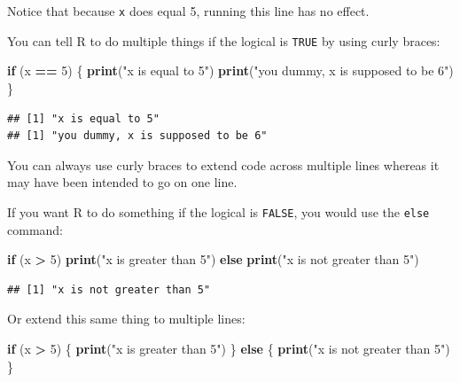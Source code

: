 \documentclass[]{book}
\newenvironment{Shaded}{\begin{snugshade}}{\end{snugshade}}
\newcommand{\KeywordTok}[1]{\textcolor[rgb]{0.13,0.29,0.53}{\textbf{#1}}}
\newcommand{\DecValTok}[1]{\textcolor[rgb]{0.00,0.00,0.81}{#1}}
\newcommand{\StringTok}[1]{\textcolor[rgb]{0.31,0.60,0.02}{#1}}
\newcommand{\ControlFlowTok}[1]{\textcolor[rgb]{0.13,0.29,0.53}{\textbf{#1}}}
\newcommand{\OperatorTok}[1]{\textcolor[rgb]{0.81,0.36,0.00}{\textbf{#1}}}
\newcommand{\NormalTok}[1]{#1}
\theoremstyle{definition}
\theoremstyle{definition}
\theoremstyle{definition}
\theoremstyle{remark}
\begin{document}
Notice that because \texttt{x} does equal 5, running this line has no
effect.

You can tell R to do multiple things if the logical is \texttt{TRUE} by
using curly braces:

\begin{Shaded}
\begin{Highlighting}[]
\ControlFlowTok{if}\NormalTok{ (x }\OperatorTok{==}\StringTok{ }\DecValTok{5}\NormalTok{) \{}
  \KeywordTok{print}\NormalTok{(}\StringTok{"x is equal to 5"}\NormalTok{)}
  \KeywordTok{print}\NormalTok{(}\StringTok{"you dummy, x is supposed to be 6"}\NormalTok{)}
\NormalTok{\}}
\end{Highlighting}
\end{Shaded}

\begin{verbatim}
## [1] "x is equal to 5"
## [1] "you dummy, x is supposed to be 6"
\end{verbatim}

You can always use curly braces to extend code across multiple lines
whereas it may have been intended to go on one line.

If you want R to do something if the logical is \texttt{FALSE}, you
would use the \texttt{else} command:

\begin{Shaded}
\begin{Highlighting}[]
\ControlFlowTok{if}\NormalTok{ (x }\OperatorTok{>}\StringTok{ }\DecValTok{5}\NormalTok{) }\KeywordTok{print}\NormalTok{(}\StringTok{"x is greater than 5"}\NormalTok{) }\ControlFlowTok{else} \KeywordTok{print}\NormalTok{(}\StringTok{"x is not greater than 5"}\NormalTok{)}
\end{Highlighting}
\end{Shaded}

\begin{verbatim}
## [1] "x is not greater than 5"
\end{verbatim}

Or extend this same thing to multiple lines:

\begin{Shaded}
\begin{Highlighting}[]
\ControlFlowTok{if}\NormalTok{ (x }\OperatorTok{>}\StringTok{ }\DecValTok{5}\NormalTok{) \{}
  \KeywordTok{print}\NormalTok{(}\StringTok{"x is greater than 5"}\NormalTok{)}
\NormalTok{\} }\ControlFlowTok{else}\NormalTok{ \{}
  \KeywordTok{print}\NormalTok{(}\StringTok{"x is not greater than 5"}\NormalTok{)}
\NormalTok{\} }
\end{Highlighting}
\end{Shaded}
\end{document}
